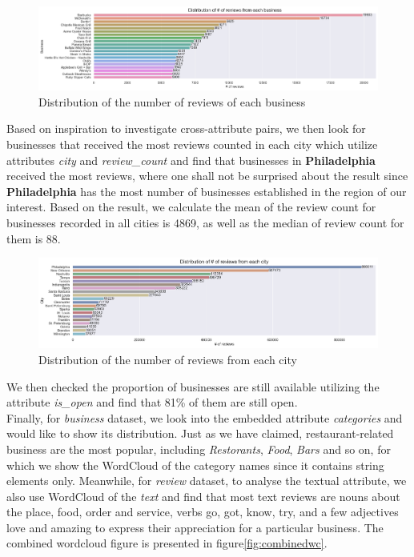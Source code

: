 \documentclass[runningheads]{llncs}
\begin{document}
\begin{figure}[!h]
\centering
\includegraphics[width=12cm]{figs/reviewcounts.png}
\caption{Distribution of the number of reviews of each business}
\label{fig:reviewcounts}
\end{figure}

Based on inspiration to investigate cross-attribute pairs, we then look for businesses that received the most reviews counted in each city which utilize attributes \textit{city} and \textit{review\_count} and find that businesses in \textbf{Philadelphia} received the most reviews, where one shall not be surprised about the result since \textbf{Philadelphia} has the most number of businesses established in the region of our interest. Based on the result, we calculate the mean of the review count for businesses recorded in all cities is 4869, as well as the median of review count for them is 88. 

\begin{figure}[!h]
\centering
\includegraphics[width=12cm]{figs/citybusiness.png}
\caption{Distribution of the number of reviews from each city}
\label{fig:citybusiness}
\end{figure}

We then checked the proportion of businesses are still available utilizing the attribute \textit{is\_open} and find that 81\% of them are still open. \\

Finally, for \textit{business} dataset, we look into the embedded attribute \textit{categories} and would like to show its distribution. Just as we have claimed, restaurant-related business are the most popular, including \textit{Restorants}, \textit{Food}, \textit{Bars} and so on, for which we show the WordCloud of the category names since it contains string elements only. Meanwhile, for \textit{review} dataset, to analyse the textual attribute, we also use WordCloud of the \textit{text} and find that most text reviews are nouns about the place, food, order and service, verbs go, got, know, try, and a few adjectives love and amazing to express their appreciation for a particular business. The combined wordcloud figure is presented in figure\ref{fig:combinedwc}.
\end{document}
